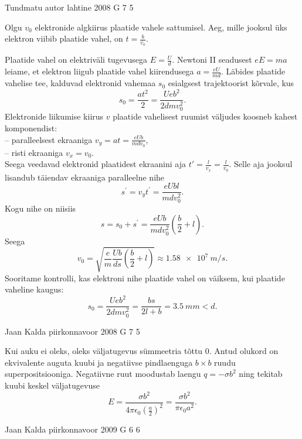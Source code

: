 \documentclass[11pt]{article}
\begin{document}
{%
{Tundmatu autor} %
{lahtine} %
{2008} %
{G 7} %
{5} %
{

\ifSolution
Olgu $v_0$ elektronide algkiirus plaatide vahele sattumisel. Aeg, mille jooksul üks elektron viibib plaatide vahel, on $t = \frac{b}{v_o}$.

Plaatide vahel on elektriväli tugevusega $E = \frac{U}{d}$. Newtoni II seadusest $eE = ma$ leiame, et elektron liigub plaatide vahel kiirendusega $a = \frac{eU}{md}$. Läbides plaatide vahelise tee, kalduvad elektronid vahemaa $s_0$ esialgsest trajektoorist kõrvale, kus
\[
s_{0}=\frac{a t^{2}}{2}=\frac{U e b^{2}}{2 d m v_{0}^{2}}.
\]
Elektronide liikumise kiirus $v$ plaatide vahelisest ruumist väljudes koosneb kahest komponendist:\\
-- paralleelsest ekraaniga $v_{y}=a t=\frac{e U b}{m d v_{0}}$,\\
-- risti ekraaniga $v_x = v_0$.\\
Seega veedavad elektronid plaatidest ekraanini aja $t' = \frac{l}{v_x} = \frac{l}{v_0}$. Selle aja jooksul lisandub täiendav ekraaniga paralleelne nihe
\[
s^{\prime}=v_{y} t^{\prime}=\frac{e U b l}{m d v_{0}^{2}}.
\]
Kogu nihe on niisiis
\[
s=s_{0}+s^{\prime}=\frac{e U b}{m d v_{0}^{2}}\left(\frac{b}{2}+l\right).
\]
Seega
\[
v_{0}=\sqrt{\frac{e}{m} \frac{U b}{d s}\left(\frac{b}{2}+l\right)} \approx \SI{1,58e7}{m/s}.
\]
Sooritame kontrolli, kas elektroni nihe plaatide vahel on väiksem, kui plaatide vaheline kaugus:
\[
s_{0}=\frac{U e b^{2}}{2 d m v_{0}^{2}}=\frac{bs}{2l + b} = \SI{3.5}{mm} < d.
\] 
\fi
}

{Jaan Kalda} %
{piirkonnavoor} %
{2008} %
{G 7} %
{5} %
{

\ifSolution
Kui auku ei oleks, oleks väljatugevus sümmeetria tõttu 0. Antud olukord on ekvivalente auguta kuubi ja negatiivse pindlaenguga $b\times b$ ruudu superpositsiooniga. Negatiivne ruut moodustab laengu $q = -\sigma b^2$ ning tekitab kuubi keskel väljatugevuse
\[
E=\frac{\sigma b^{2}}{4\pi \epsilon_{0} \left(\frac{a}{2}\right)^{2}} = \frac{\sigma b^{2}}{\pi \epsilon_{0} a^{2}}.
\]
\fi
}

{Jaan Kalda} %
{piirkonnavoor} %
{2009} %
{G 6} %
{6} %
{

}}
\end{document}
